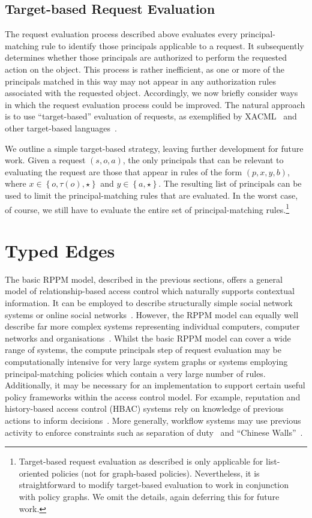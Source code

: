 \documentclass{article}
\newcommand{\set}[1]{\ensuremath{\left\{#1\right\}}} \newcommand{\setO}[1]{\ensuremath{\left\{#1\right.}} \newcommand{\setC}[1]{\ensuremath{\left.#1\right\}}} \newcommand{\setN}[1]{\ensuremath{\left.#1\right.}} \newcommand{\sett}[1]{\ensuremath{\left\{\textit{#1}\right\}}} \newcommand{\tuple}[1]{\ensuremath{\left(#1\right)}} \newcommand{\tuplet}[1]{\ensuremath{\left(\textit{#1}\right)}} \newcommand{\card}[1]{\left| #1 \right|}
\begin{document}
\subsection{Target-based Request Evaluation}\label{sec:requests:target-based}

The request evaluation process described above evaluates every principal-matching rule to identify those principals applicable to a request.
It subsequently determines whether those principals are authorized to perform the requested action on the object.
This process is rather inefficient, as one or more of the principals matched in this way may not appear in any authorization rules associated with the requested object.
Accordingly, we now briefly consider ways in which the request evaluation process could be improved.
The natural approach is to use ``target-based'' evaluation of requests, as exemplified by XACML~\cite{XACML3} and other target-based languages~\cite{BrunsH11,CramptonM12}.

We outline a simple target-based strategy, leaving further development for future work.
Given a request $(s,o,a)$, the only principals that can be relevant to evaluating the request are those that appear in rules of the form $(p,x,y,b)$, where $x \in \set{o,\tau(o),\star}$ and $y \in \set{a,\star}$.
The resulting list of principals can be used to limit the principal-matching rules that are evaluated.
In the worst case, of course, we still have to evaluate the entire set of principal-matching rules.\footnote{Target-based request evaluation as described is only applicable for list-oriented policies (not for graph-based policies). Nevertheless, it is straightforward to modify target-based evaluation to work in conjunction with policy graphs.  We omit the details, again deferring this for future work.}

\section{Typed Edges}\label{sec:extended_typed_edges}
The basic RPPM model, described in the previous sections, offers a general model of relationship-based access control which naturally supports contextual information.
It can be employed to describe structurally simple social network systems or online social networks~\cite{ChengPS12passat,ChengPS12dbsec,Fong11}.
However, the RPPM model can equally well describe far more complex systems representing individual computers, computer networks and organisations~\cite{CramptonS14}.
Whilst the basic RPPM model can cover a wide range of systems, the compute principals step of request evaluation may be computationally intensive for very large system graphs or systems employing principal-matching policies which contain a very large number of rules.
Additionally, it may be necessary for an implementation to support certain useful policy frameworks within the access control model.
For example, reputation and history-based access control (HBAC) systems rely on knowledge of previous actions to inform decisions~\cite{AbadiF03,EdjlaliAC99,KrukowNS08}.
More generally, workflow systems may use previous activity to enforce constraints such as separation of duty~\cite{GligorGF98,SimonZ97} and ``Chinese Walls''~\cite{BrewerN89}.
\end{document}
